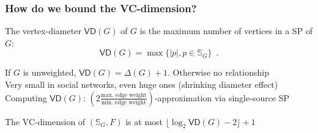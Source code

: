 
\begin{frame}
  \frametitle{How do we bound the VC-dimension?}
  \begin{definition}
    The vertex-diameter $\mathsf{VD}(G)$ of $G$ is the maximum number of
    vertices in a SP of $G$:
    \[
      \mathsf{VD}(G)=\max\{|p|, p\in\mathbb{S}_G\}\enspace.
    \]
  \end{definition}
  If $G$ is unweighted, $\mathsf{VD}(G)=\Delta(G)+1$. Otherwise no relationship\\
  Very small in social networks, even huge ones (shrinking diameter effect)
  \vfill
  \pause
  Computing $\mathsf{VD}(G)$: $\left(2\frac{\mbox{max.~edge weight}}{\mbox{min.~edge
  weight}}\right)$-approximation via single-source SP
  \pause
  \vfill
  \begin{theorem}
    The VC-dimension of $(\mathbb{S}_G,F)$ is at most $\lfloor\log_2\mathsf{VD}(G)
  -2\rfloor +1$
  \end{theorem}
\end{frame}

